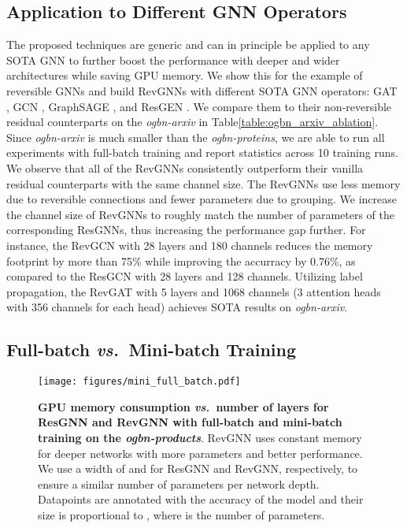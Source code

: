 \documentclass{article}
\newcommand{\vs}{\emph{vs.~}}
\newcommand{\tblLabel}{Table\xspace}
\begin{document}
\subsection{Application to Different GNN Operators}
The proposed techniques are generic and can in principle be applied to any SOTA GNN to further boost the performance with deeper and wider architectures while saving GPU memory. We show this for the example of reversible GNNs and build RevGNNs with different SOTA GNN operators: GAT \citep{veli2018gat}, GCN \citep{kipf2017semi}, GraphSAGE \citep{hamilton2017inductive}, and ResGEN \citep{li2020deepergcn}. We compare them to their non-reversible residual counterparts on the \emph{ogbn-arxiv} in \tblLabel \ref{table:ogbn_arxiv_ablation}. Since \emph{ogbn-arxiv} is much smaller than the \emph{ogbn-proteins}, we are able to run all experiments with full-batch training and report statistics across 10 training runs. We observe that all of the RevGNNs consistently outperform their vanilla residual counterparts with the same channel size. The RevGNNs use less memory due to reversible connections and fewer parameters due to grouping. We increase the channel size of RevGNNs to roughly match the number of parameters of the corresponding ResGNNs, thus increasing the performance gap further. For instance, the RevGCN with 28 layers and 180 channels reduces the memory footprint by more than 75\% while improving the accurracy by 0.76\%, as compared to the ResGCN with 28 layers and 128 channels. Utilizing label propagation, the RevGAT with 5 layers and 1068 channels (3 attention heads with 356 channels for each head) achieves SOTA results on \emph{ogbn-arxiv}.

\subsection{Full-batch \vs Mini-batch Training}

\begin{figure}[!t]
    \centering
    \texttt{[image: figures/mini\_full\_batch.pdf]}
    \caption{\textbf{GPU memory consumption \vs number of layers for ResGNN \citep{li2020deepergcn} and RevGNN with full-batch and mini-batch training on the \emph{ogbn-products}}. RevGNN uses constant memory for deeper networks with more parameters and better performance. We use a width of  and  for ResGNN and RevGNN, respectively,  to ensure a similar number of parameters per network depth. Datapoints are annotated with the accuracy of the model and their size is proportional to , where  is the number of parameters.}
    \vspace{-11pt}
    \label{fig:mini_full_batch}
\end{figure}
\end{document}
